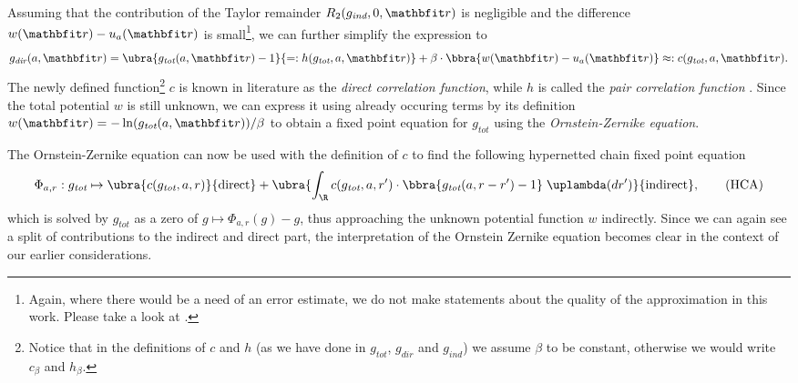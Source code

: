 Assuming that the contribution of the Taylor remainder $R_2(g_{\textit{ind}},0,\vr)$ is negligible and the difference $w(\vr) - u_a(\vr)$ is small\footnote{Again, where there would be a need of an error estimate, we do not make statements about the quality of the approximation in this work. Please take a look at \cite{book:HANSEN.chap3}.}, we can further simplify the expression to
\[
    g_{\textit{dir}}(a,\vr) = \ubra{g_{\textit{tot}}(a,\vr) - 1}{=:h(g_{\textit{tot}},a,\vr)} + \beta\cdot \bbra{w(\vr) - u_a(\vr)} \approx : c(g_{\textit{tot}},a,\vr).
\]
The newly defined function\footnote{Notice that in the definitions of $c$ and $h$ (as we have done in $g_{\textit{tot}}$, $g_{\textit{dir}}$ and $g_{\textit{ind}}$) we assume $\beta$ to be constant, otherwise we would write $c_\beta$ and $h_\beta$.} $c$ is known in literature as the \emph{direct correlation function}, while $h$ is called the \emph{pair correlation function} \cite{book:HANSEN.chap4}. Since the total potential $w$ is still unknown, we can express it using already occuring terms by its definition $w(\vr) = -\ln(g_{\textit{tot}}(a,\vr))/\beta$ to obtain a fixed point equation for $g_{\textit{tot}}$ using the \emph{Ornstein-Zernike equation}.

The Ornstein-Zernike equation can now be used with the definition of $c$ to find the following hypernetted chain fixed point equation
\begin{align}
    \Phi_{a,r}:g_{\textit{tot}}\mapsto \ubra{c(g_{\textit{tot}},a,r)}{\text{direct}} + \ubra{\int_{\R}c(g_{\textit{tot}},a,r')\cdot \bbra{g_{\textit{tot}}(a,r - r') - 1}\;\uplambda(dr')}{\text{indirect}},\label{eq:FixedPointEquationHCA}\tag{HCA}
\end{align}
which is solved by $g_{\textit{tot}}$ as a zero of $g\mapsto \Phi_{a,r}(g) - g$, thus approaching the unknown potential function $w$ indirectly. Since we can again see a split of contributions to the indirect and direct part, the interpretation of the Ornstein Zernike equation becomes clear in the context of our earlier considerations.

